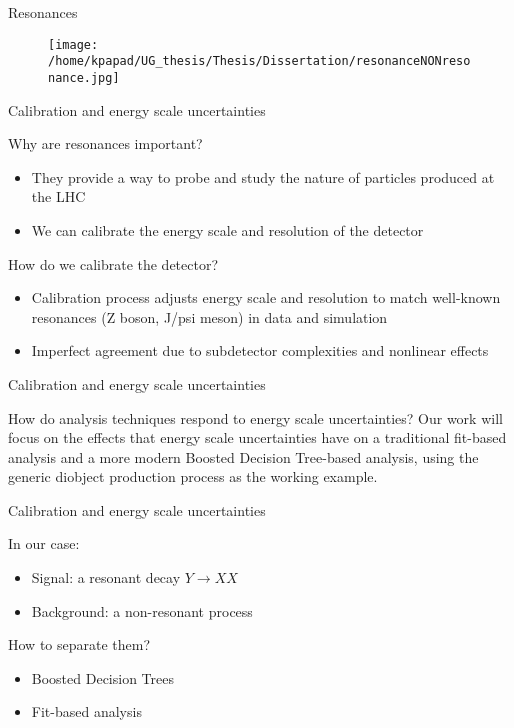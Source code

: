 \documentclass[bigger]{beamer}
\begin{document}
\begin{frame}[label={sec:orgb4188a6}]{Resonances}
\begin{figure}[hb]
\centering
\texttt{[image: /home/kpapad/UG\_thesis/Thesis/Dissertation/resonanceNONresonance.jpg]}
\end{figure}
\end{frame}
\begin{frame}[label={sec:org59206de}]{Calibration and energy scale uncertainties}
\begin{block}{Why are resonances important?}
\begin{itemize}
\item They provide a way to probe and study the nature of particles produced at the LHC
\item We can calibrate the energy scale and resolution of the detector
\end{itemize}
\end{block}
\begin{block}{How do we calibrate the detector?}
\begin{itemize}
\item Calibration process adjusts energy scale and resolution to match well-known resonances (Z boson, J/psi meson) in data and simulation
\item Imperfect agreement due to subdetector complexities and nonlinear effects
\end{itemize}
\end{block}
\end{frame}
\begin{frame}[label={sec:orgec47dcd}]{Calibration and energy scale uncertainties}
\begin{block}{How do analysis techniques respond to energy scale uncertainties?}
Our work will focus on the effects that energy scale uncertainties have on a traditional fit-based analysis and a more modern Boosted Decision Tree-based analysis, using the generic diobject production process as the working example.
\end{block}
\end{frame}
\begin{frame}[label={sec:orgc9a7245}]{Calibration and energy scale uncertainties}
\begin{block}{In our case:}
\begin{itemize}
\item Signal: a resonant decay \(Y \rightarrow XX\)
\item Background: a non-resonant process
\end{itemize}
\end{block}
\begin{block}{How to separate them?}
\begin{itemize}
\item Boosted Decision Trees
\item Fit-based analysis
\end{itemize}
\end{block}
\end{frame}
\end{document}
